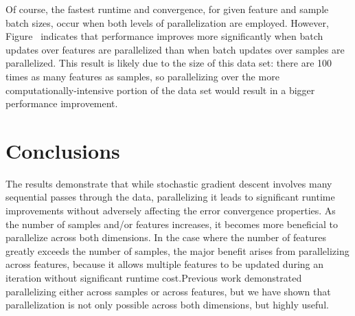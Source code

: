 \documentclass{article}
\begin{document}
Of course, the fastest runtime and convergence, for given feature and sample batch sizes, occur when both levels of parallelization are employed. However, Figure~\cite{fig:NAME} indicates that performance improves more significantly when batch updates over features are parallelized than when batch updates over samples are parallelized. This result is likely due to the size of this data set: there are 100 times as many features as samples, so parallelizing over the more computationally-intensive portion of the data set would result in a bigger performance improvement.

\section{Conclusions}
The results demonstrate that while stochastic gradient descent involves many sequential passes through the data, parallelizing it leads to significant runtime improvements without adversely affecting the error convergence properties.  As the number of samples and/or features increases, it becomes more beneficial to parallelize across both dimensions.  In the case where the number of features greatly exceeds the number of samples, the major benefit arises from parallelizing across features, because it allows multiple features to be updated during an iteration without significant runtime cost.Previous work demonstrated parallelizing either across samples or across features, but we have shown that parallelization is not only possible across both dimensions, but highly useful.



\end{document}

